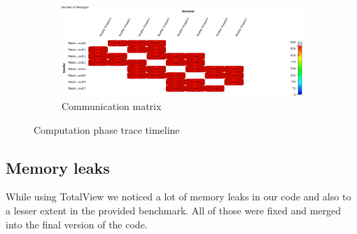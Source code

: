 \documentclass{article}
\begin{document}
\begin{figure}
	\begin{subfigure}[b]{\textwidth}
		\includegraphics[width=\textwidth]{comp-pent-dual-allread-8-Communication_Matrix_View_traces.png}
		\caption{Communication matrix}
		\label{fig:commatrx}
	\end{subfigure}
	\caption{Computation phase trace timeline}\label{fig:8}
\end{figure}

\subsection{Memory leaks}
While using TotalView we noticed a lot of memory leaks in our code and also to a lesser extent in the provided benchmark. All of those were fixed and merged into the final version of the code.

\end{document}
